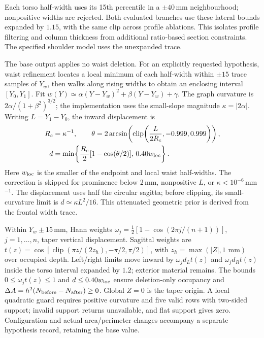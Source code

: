\documentclass[11pt,a4paper]{article}
\newcommand{\clip}{\operatorname{clip}}
\begin{document}
Each torso half-width uses its 15th percentile in a $\pm40$\,mm neighbourhood; nonpositive widths are rejected. Both evaluated branches use these lateral bounds expanded by $1.15$, with the same clip across profile ablations. This isolates profile filtering and column thickness from additional ratio-based section constraints. The specified shoulder model uses the unexpanded trace.

The base output applies no waist deletion. For an explicitly requested hypothesis, waist refinement locates a local minimum of each half-width within $\pm15$ trace samples of $Y_w$, then walks along rising widths to obtain an enclosing interval $[Y_0,Y_1]$. Fit $w(Y)\simeq\alpha(Y-Y_w)^2+\beta(Y-Y_w)+\gamma$. The graph curvature is $2\alpha/(1+\beta^2)^{3/2}$; the implementation uses the small-slope magnitude $\kappa=|2\alpha|$. Writing $L=Y_1-Y_0$, the inward displacement is
\begin{equation}
 \begin{aligned}
 R_c&=\kappa^{-1},\qquad
 \theta=2\arcsin\!\left(\clip\!\left(\frac{L}{2R_c},-0.999,0.999\right)\right),\\
 d&=\min\!\left\{\frac{R_c}{2}[1-\cos(\theta/2)],\,0.40w_{\rm loc}\right\}.
 \end{aligned}
 \label{eq:waist}
\end{equation}
Here $w_{\rm loc}$ is the smaller of the endpoint and local waist half-widths. The correction is skipped for prominence below 2\,mm, nonpositive $L$, or $\kappa<10^{-6}$\,mm$^{-1}$. The displacement uses half the circular sagitta; before clipping, its small-curvature limit is $d\simeq\kappa L^2/16$. This attenuated geometric prior is derived from the frontal width trace.

Within $Y_w\pm15$\,mm, Hann weights $\omega_j=\tfrac12[1-\cos(2\pi j/(n+1))]$, $j=1,\ldots,n$, taper vertical displacement. Sagittal weights are $t(z)=\cos[\clip(\pi z/(2z_h),-\pi/2,\pi/2)]$, with $z_h=\max(|Z|,1\text{ mm})$ over occupied depth. Left/right limits move inward by $\omega_jd_Lt(z)$ and $\omega_jd_Rt(z)$ inside the torso interval expanded by $1.2$; exterior material remains. The bounds $0\leq\omega_jt(z)\leq1$ and $d\leq0.40w_{\rm loc}$ ensure deletion-only occupancy and $\Delta A=h^2(N_{\rm before}-N_{\rm after})\geq0$. Global $Z=0$ is the taper origin. A local quadratic guard requires positive curvature and five valid rows with two-sided support; invalid support returns unavailable, and flat support gives zero. Configuration and actual area/perimeter changes accompany a separate hypothesis record, retaining the base value.
\end{document}
